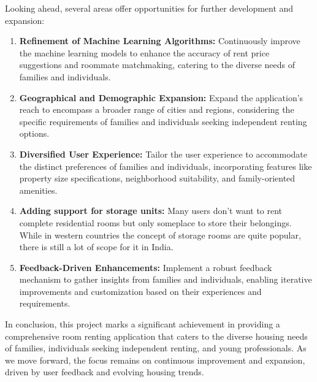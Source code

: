 Looking ahead, several areas offer opportunities for further development and expansion:
\begin{enumerate}
    \item \textbf{Refinement of Machine Learning Algorithms:} Continuously improve the machine learning models to enhance the accuracy of rent price suggestions and roommate matchmaking, catering to the diverse needs of families and individuals.

    \item \textbf{Geographical and Demographic Expansion:} Expand the application's reach to encompass a broader range of cities and regions, considering the specific requirements of families and individuals seeking independent renting options.

    \item \textbf{Diversified User Experience:} Tailor the user experience to accommodate the distinct preferences of families and individuals, incorporating features like property size specifications, neighborhood suitability, and family-oriented amenities.

    \item \textbf{Adding support for storage units:} Many users don't want to rent complete residential rooms but only someplace to store their belongings. While in western countries the concept of storage rooms are quite popular, there is still a lot of scope for it in India.

    \item \textbf{Feedback-Driven Enhancements:} Implement a robust feedback mechanism to gather insights from families and individuals, enabling iterative improvements and customization based on their experiences and requirements.
\end{enumerate}
\bigskip
In conclusion, this project marks a significant achievement in providing a comprehensive room renting application that caters to the diverse housing needs of families, individuals seeking independent renting, and young professionals. As we move forward, the focus remains on continuous improvement and expansion, driven by user feedback and evolving housing trends.

